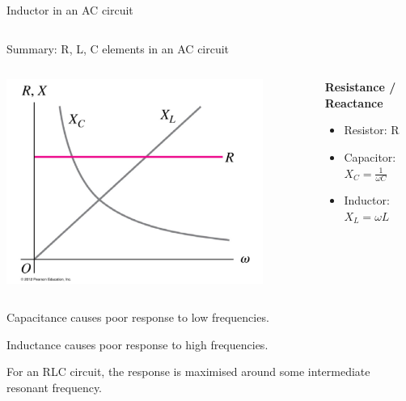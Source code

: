 \begin{frame}{Inductor in an AC circuit}
\begin{columns}
\begin{column}{0.50\textwidth}
\begin{center}
     \end{center}
  \end{column}
\end{columns}

\end{frame}

%
%
%

\begin{frame}{Summary: R, L, C elements in an AC circuit}

\begin{columns}
  \begin{column}{0.60\textwidth}
    \begin{center}
       \includegraphics[width=0.85\textwidth]{./images/schematics/reactance_freq_dependence.png}\\
     \end{center}
  \end{column}
  \begin{column}{0.40\textwidth}
        {\bf Resistance / Reactance}\\
        \vspace{0.2cm}
        \begin{itemize}
           \item Resistor: R
           \item Capacitor: $\displaystyle X_C = \frac{1}{\omega C}$
           \item Inductor: $\displaystyle X_L = \omega L$
        \end{itemize}
  \end{column}
\end{columns}

\begin{itemize}
{\small
\item Capacitance causes poor response to low frequencies.
\item Inductance causes poor response to high frequencies.
\item For an RLC circuit, the response is maximised around some intermediate resonant frequency.
}
\end{itemize}

\end{frame}

